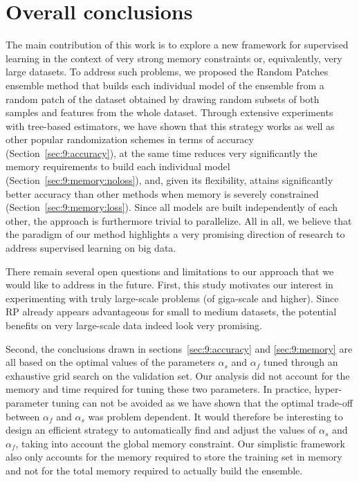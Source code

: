 \section{Overall conclusions}
\label{sec:9:conclusions}

The main contribution of this work is to explore a new framework for supervised
learning in the context of very strong memory constraints or, equivalently, very
large datasets. To address such problems, we proposed the Random Patches
ensemble method that builds each individual model of the ensemble from a random
patch of the dataset obtained by drawing random subsets of both samples and
features from the whole dataset. Through extensive experiments with tree-based
estimators, we have shown that this strategy works as well as other popular
randomization schemes in terms of accuracy (Section~\ref{sec:9:accuracy}), at the
same time reduces very significantly the memory requirements to build each
individual model (Section~\ref{sec:9:memory:noloss}), and, given its flexibility,
attains significantly better accuracy than other methods when memory is severely
constrained (Section~\ref{sec:9:memory:loss}). Since all models are built
independently of each other, the approach is furthermore trivial to parallelize.
All in all, we believe that the paradigm of our method highlights a very promising
direction of research to address supervised learning on big data.

There remain several open questions and limitations to our approach that we
would like to address in the future. First, this study motivates our interest in
experimenting with truly large-scale problems (of giga-scale and higher). Since
RP already appears advantageous for small to medium datasets, the potential benefits on
very large-scale data indeed look very promising.

Second, the conclusions drawn in sections~\ref{sec:9:accuracy} and
\ref{sec:9:memory} are all based on the optimal values of the parameters $\alpha_s$ and
$\alpha_f$ tuned through an exhaustive grid search on the validation set. Our
analysis did not account for the memory and time required for tuning these two
parameters. In practice, hyper-parameter tuning can not be avoided as we have
shown that the optimal trade-off between $\alpha_f$ and $\alpha_s$ was problem dependent.
It would therefore be interesting to design an efficient strategy to
automatically find and adjust the values of $\alpha_s$ and $\alpha_f$, taking into account
the global memory constraint. Our simplistic framework also only accounts for
the memory required to store the training set in memory and not for the total
memory required to actually build the ensemble.

